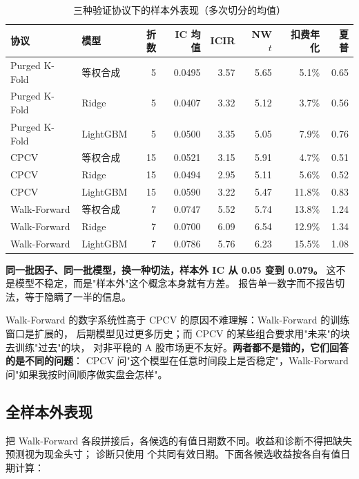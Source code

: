 \begin{table}[htbp]
\centering
\caption{三种验证协议下的样本外表现（多次切分的均值）}
\label{tab:protocol}
\small
\begin{tabular}{@{}llrrrrrr@{}}
\toprule
协议 & 模型 & 折数 & IC 均值 & ICIR & NW $t$ & 扣费年化 & 夏普 \\
\midrule
Purged K-Fold & 等权合成 & 5 & 0.0495 & 3.57 & 5.65 & 5.1\% & 0.65 \\
Purged K-Fold & Ridge & 5 & 0.0407 & 3.32 & 5.12 & 3.7\% & 0.56 \\
Purged K-Fold & LightGBM & 5 & 0.0500 & 3.35 & 5.05 & 7.9\% & 0.76 \\
\midrule
CPCV & 等权合成 & 15 & 0.0521 & 3.15 & 5.91 & 4.7\% & 0.51 \\
CPCV & Ridge & 15 & 0.0494 & 2.95 & 5.11 & 5.6\% & 0.52 \\
CPCV & LightGBM & 15 & 0.0590 & 3.22 & 5.47 & 11.8\% & 0.83 \\
\midrule
Walk-Forward & 等权合成 & 7 & 0.0747 & 5.52 & 5.74 & 13.8\% & 1.24 \\
Walk-Forward & Ridge & 7 & 0.0700 & 6.09 & 6.54 & 12.9\% & 1.34 \\
Walk-Forward & LightGBM & 7 & 0.0786 & 5.76 & 6.23 & 15.5\% & 1.08 \\
\bottomrule
\end{tabular}
\end{table}

\begin{keybox}[这张表最重要的一件事]
\textbf{同一批因子、同一批模型，换一种切法，样本外 IC 从 0.05 变到 0.079。}
这不是模型不稳定，而是"样本外"这个概念本身就有方差。
报告单一数字而不报告切法，等于隐瞒了一半的信息。
\end{keybox}

Walk-Forward 的数字系统性高于 CPCV 的原因不难理解：Walk-Forward 的训练窗口是扩展的，
后期模型见过更多历史；而 CPCV 的某些组合要求用"未来"的块去训练"过去"的块，
对非平稳的 A 股市场更不友好。\textbf{两者都不是错的，它们回答的是不同的问题}：
CPCV 问"这个模型在任意时间段上是否稳定"，Walk-Forward 问"如果我按时间顺序做实盘会怎样"。

\subsection{全样本外表现}

把 Walk-Forward 各段拼接后，各候选的有值日期数不同。收益和诊断不得把缺失预测视为现金头寸；
诊断只使用 \AuditCommonN{} 个共同有效日期。下面各候选收益按各自有值日期计算：

